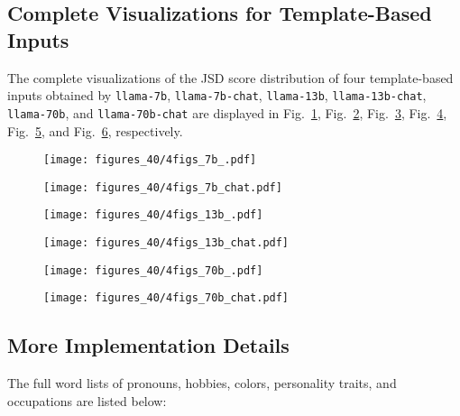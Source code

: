 \documentclass{article}
\begin{document}
\subsection{Complete Visualizations for Template-Based Inputs}
\label{sec: visual template-based}
The complete visualizations of the JSD score distribution of four template-based inputs obtained by \texttt{llama-7b}, \texttt{llama-7b-chat}, \texttt{llama-13b}, \texttt{llama-13b-chat}, \texttt{llama-70b}, and \texttt{llama-70b-chat} are displayed in Fig.~\ref{fig:individual distribution 7b}, Fig.~\ref{fig:individual distribution 7b chat}, Fig.~\ref{fig:individual distribution 13b}, Fig.~\ref{fig:individual distribution 13b chat}, Fig.~\ref{fig:individual distribution 70b}, and Fig.~\ref{fig:individual distribution 70b chat}, respectively.

\begin{figure}[!hbtp]
  \centering
  \texttt{[image: figures\_40/4figs\_7b\_.pdf]}
  \caption{}
  \label{fig:individual distribution 7b}
\end{figure}

\begin{figure}[!hbtp]
  \centering
  \texttt{[image: figures\_40/4figs\_7b\_chat.pdf]}
  \caption{}
  \label{fig:individual distribution 7b chat}
\end{figure}

\begin{figure}[!hbtp]
  \centering
  \texttt{[image: figures\_40/4figs\_13b\_.pdf]}
  \caption{}
  \label{fig:individual distribution 13b}
\end{figure}

\begin{figure}[!hbtp]
  \centering
  \texttt{[image: figures\_40/4figs\_13b\_chat.pdf]}
  \caption{}
  \label{fig:individual distribution 13b chat}
\end{figure}

\begin{figure}[!hbtp]
  \centering
  \texttt{[image: figures\_40/4figs\_70b\_.pdf]}
  \caption{}
  \label{fig:individual distribution 70b}
\end{figure}

\begin{figure}[!hbtp]
  \centering
  \texttt{[image: figures\_40/4figs\_70b\_chat.pdf]}
  \caption{}
  \label{fig:individual distribution 70b chat}
\end{figure}

\subsection{More Implementation Details}
\label{ssec:lists}
The full word lists of pronouns, hobbies, colors, personality traits, and occupations are listed below:
\end{document}
